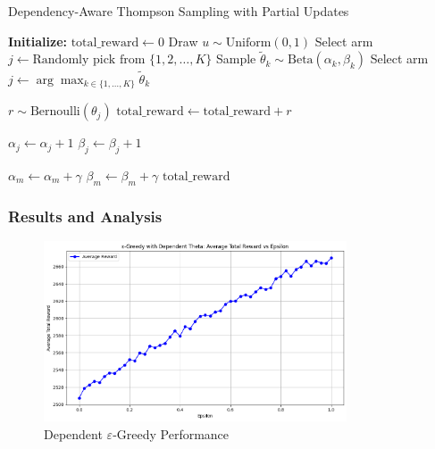 \documentclass[11pt]{article}
\begin{document}
\begin{algorithm}
\caption{Dependency-Aware Thompson Sampling with Partial Updates}
\begin{algorithmic}[1]
\State \textbf{Initialize:} $\text{total\_reward} \gets 0$
    \State Draw $u \sim \text{Uniform}(0, 1)$
        \State Select arm $j \gets \text{Randomly pick from } \{1, 2, \ldots, K\}$
    \Else
            \State Sample $\tilde{\theta}_k \sim \text{Beta}(\alpha_k, \beta_k)$
        \EndFor
        \State Select arm $j \gets \arg\max_{k \in \{1,\ldots,K\}} \tilde{\theta}_k$
    \EndIf
    
    \State $r \sim \text{Bernoulli}(\theta_j)$
    \State $\text{total\_reward} \gets \text{total\_reward} + r$
    
        \State $\alpha_j \gets \alpha_j + 1$
    \Else
        \State $\beta_j \gets \beta_j + 1$
    \EndIf
    
                \State $\alpha_m \gets \alpha_m + \gamma$
            \Else
                \State $\beta_m \gets \beta_m + \gamma$
            \EndIf
        \EndIf
    \EndFor
\EndFor
\State \Return $\text{total\_reward}$
\end{algorithmic}
\end{algorithm}



\newpage
\subsubsection*{Results and Analysis}
\begin{figure}[H]
    \centering
    \includegraphics[width=0.8\textwidth]{pics/greedy_dependence.png}
    \caption{Dependent \(\varepsilon\)-Greedy Performance}
    \label{fig:dep_greedy}
\end{figure}
\end{document}
